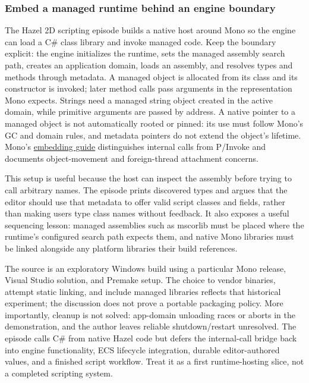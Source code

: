 \subsubsection{Embed a managed runtime behind an engine boundary}\label{06-engine-ii-ch040-embed-a-managed-runtime-behind-an-engine-boundary}

The Hazel 2D scripting episode builds a native host around Mono so the engine can load a C\# class library and invoke managed code. Keep the boundary explicit: the engine initializes the runtime, sets the managed assembly search path, creates an application domain, loads an assembly, and resolves types and methods through metadata. A managed object is allocated from its class and its constructor is invoked; later method calls pass arguments in the representation Mono expects. Strings need a managed string object created in the active domain, while primitive arguments are passed by address. A native pointer to a managed object is not automatically rooted or pinned: its use must follow Mono's GC and domain rules, and metadata pointers do not extend the object's lifetime. Mono's \href{https://www.mono-project.com/docs/advanced/embedding/}{embedding guide} distinguishes internal calls from P/Invoke and documents object-movement and foreign-thread attachment concerns.

This setup is useful because the host can inspect the assembly before trying to call arbitrary names. The episode prints discovered types and argues that the editor should use that metadata to offer valid script classes and fields, rather than making users type class names without feedback. It also exposes a useful sequencing lesson: managed assemblies such as mscorlib must be placed where the runtime's configured search path expects them, and native Mono libraries must be linked alongside any platform libraries their build references.

The source is an exploratory Windows build using a particular Mono release, Visual Studio solution, and Premake setup. The choice to vendor binaries, attempt static linking, and include managed libraries reflects that historical experiment; the discussion does not prove a portable packaging policy. More importantly, cleanup is not solved: app-domain unloading races or aborts in the demonstration, and the author leaves reliable shutdown/restart unresolved. The episode calls C\# from native Hazel code but defers the internal-call bridge back into engine functionality, ECS lifecycle integration, durable editor-authored values, and a finished script workflow. Treat it as a first runtime-hosting slice, not a completed scripting system.


